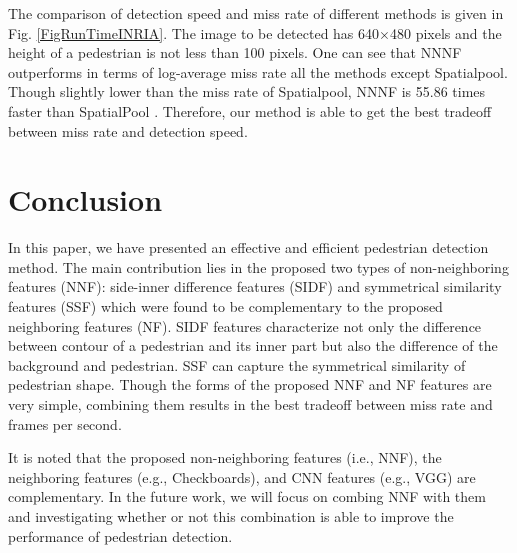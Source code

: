 \documentclass[10pt,twocolumn,letterpaper]{article}
\begin{document}
The comparison of detection speed and miss rate of different methods is 
given in Fig. \ref{FigRunTimeINRIA}. The image to be detected has 640$\times $480 pixels and the 
height of a pedestrian is not less than 100 pixels. One can see that NNNF outperforms in terms of log-average miss rate all the 
methods except Spatialpool. Though slightly lower than the miss rate of 
Spatialpool, NNNF is 55.86 times faster than SpatialPool \cite{Paisitkriangkrai_SpatialPool_ECCV_2014}. Therefore, our 
method is able to get the best tradeoff between miss rate and detection 
speed.


\section{Conclusion}
In this paper, we have presented an effective and efficient pedestrian detection method. The main contribution lies in the proposed two types of non-neighboring features (NNF): side-inner difference features (SIDF) and symmetrical similarity features (SSF) which were found to be complementary to the proposed neighboring features (NF). SIDF features characterize not only the difference between contour of a pedestrian and its inner part but also the difference of the background and pedestrian. SSF can capture the symmetrical similarity of pedestrian shape. Though the forms of the proposed NNF and NF features are very simple, combining them results in the best tradeoff between miss rate and frames per second.

It is noted that the proposed non-neighboring features (i.e., NNF), the neighboring features (e.g., Checkboards), and CNN features (e.g., VGG) are complementary. In the future work, we will focus on combing NNF with them and investigating whether or not this combination is able to improve the performance of pedestrian detection.



{\small


}
\end{document}
